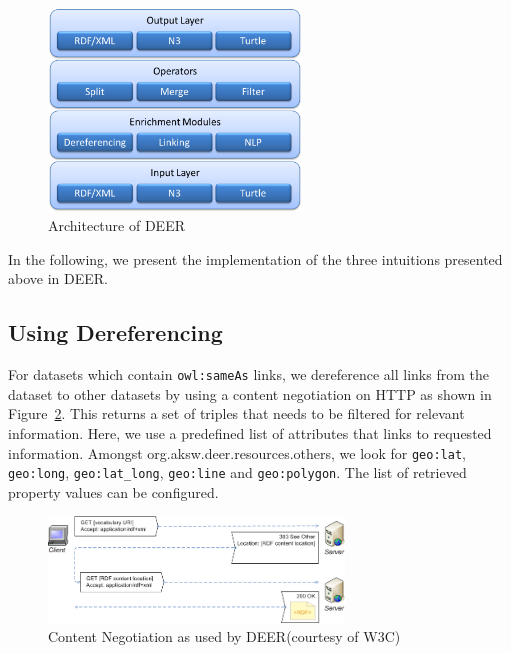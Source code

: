 \documentclass[a4paper,twoside,bibtotoc,abstracton,12pt,BCOR=15mm]{article}
\newcommand{\geolift}{\textsc{DEER}\xspace}
\begin{document}
\begin{figure}[ht!]
			\centering
			\includegraphics[width = 0.6\textwidth]{images/geolift_architecture.png}
			\caption{Architecture of \geolift}
			\label{fig:architecture}
		\end{figure}

In the following, we present the implementation of the three intuitions presented above in \geolift.
\subsection{Using Dereferencing}
For datasets which contain \texttt{owl:sameAs} links, we dereference all links from the dataset to other datasets by using a content negotiation on HTTP as shown in Figure~\ref{fig:contentNegotiation}.
This returns a set of triples that needs to be filtered for relevant information.
Here, we use a predefined list of attributes that links to requested information.
Amongst org.aksw.deer.resources.others, we look for \texttt{geo:lat}, \texttt{geo:long}, \texttt{geo:lat\_long}, \texttt{geo:line} and \texttt{geo:polygon}.
The list of retrieved property values can be configured.

\begin{figure}[htb]
\centering
\includegraphics[width=0.7\textwidth]{images/contentnegotiation}
\caption{Content Negotiation as used by \geolift (courtesy of W3C)}
\label{fig:contentNegotiation}
\end{figure}
\end{document}
